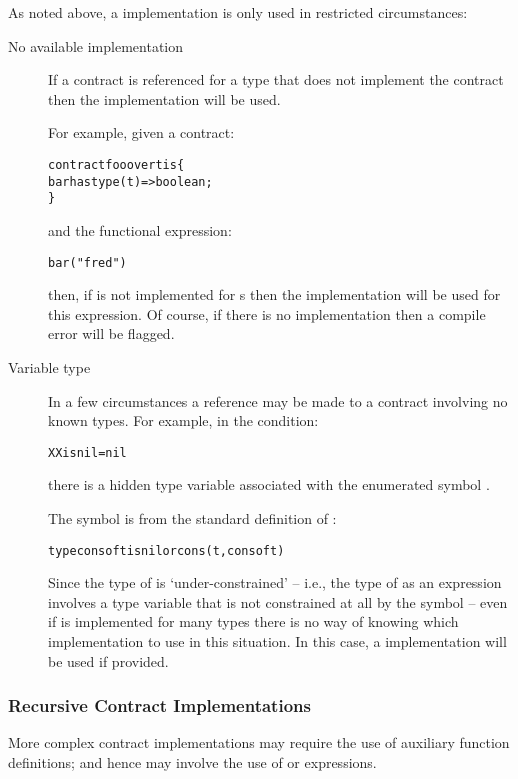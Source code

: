 As noted above, a  implementation is only used in restricted circumstances:
\begin{description}
\item[No available implementation] If a contract is referenced for a type that does not implement the contract then the  implementation will be used. 

For example, given a contract:
\begin{alltt}
contract foo over \pcent{}t is \{
  bar has type (\pcent{}t)=>boolean;
\}
\end{alltt}
and the functional expression:
\begin{alltt}
bar("fred")
\end{alltt}
then, if  is not implemented for s then the  implementation will be used for this expression. Of course, if there is no  implementation then a compile error will be flagged.
\item[Variable type]
In a few circumstances a reference may be made to a contract involving no known types. For example, in the condition:
\begin{alltt}
XX is nil=nil
\end{alltt}
there is a hidden type variable associated with the enumerated symbol . 
\begin{aside}
The symbol  is from the standard definition of :
\begin{alltt}
type cons of t is nil or cons(t,cons of t)
\end{alltt}
\end{aside}
Since the type of  is `under-constrained' -- i.e., the type of  as an expression involves a type variable that is not constrained at all by the  symbol -- even if  is implemented for many types there is no way of knowing which implementation to use in this situation. In this case, a  implementation will be used if provided.
\end{description}


\subsubsection{Recursive Contract Implementations}

More complex contract implementations may require the use of auxiliary function definitions; and hence may involve the use of  or  expressions.

